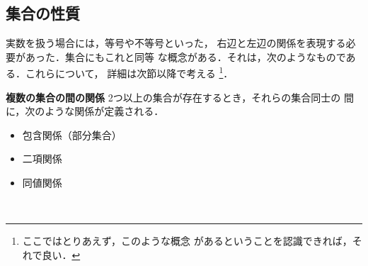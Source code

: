             \subsection{集合の性質}
                実数を扱う場合には，等号や不等号といった，
                右辺と左辺の関係を表現する必要があった．集合にもこれと同等
                な概念がある．それは，次のようなものである．これらについて，
                詳細は次節以降で考える
                    \footnote{
                        ここではとりあえず，このような概念
                        があるということを認識できれば，それで良い．
                    }．
                \\
                \begin{itembox}[l]{\textbf{複数の集合の間の関係}}
                    2つ以上の集合が存在するとき，それらの集合同士の
                    間に，次のような関係が定義される．
                        \begin{itemize}
                            \item 包含関係（部分集合）
                            \item 二項関係
                            \item 同値関係
                        \end{itemize}
                \end{itembox}
                \\


